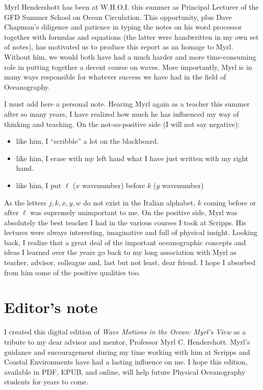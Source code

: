 Myrl Hendershott has been at W.H.O.I. this summer as Principal Lecturer of
the GFD Summer School on Ocean Circulation. This opportunity, plus Dave
Chapman's diligence and patience in typing the notes on his word processor together
with formulas and equations (the latter were handwritten in my own set of notes), has
motivated us to produce this report as an homage to Myrl. Without him, we would
both have had a much harder and more time-consuming role in putting together a
decent course on waves. More importantly, Myrl is in many ways responsible for
whatever success we have had in the field of Oceanography.

I must add here a personal note. Hearing Myrl again as a teacher this summer
after so many years, I have realized how much he has influenced my way of thinking
and teaching. On the not-so-positive side (I will not say negative):
\begin{itemize}[leftmargin=2.2em,itemsep=0pt,topsep=0.1em,parsep=0pt,partopsep=0pt]
	\item like him, I ``scribble'' a lot on the blackboard.
	\item like him, I erase with my left hand what I have just written with my right hand.
	\item like him, I put $\ell$ ($x$ wavenumber) before $k$ ($y$ wavenumber)
\end{itemize}
As the letters $j,k,x,y,w$ do not exist in the Italian alphabet, $k$ coming before or after
$\ell$ was supremely unimportant to me. On the positive side, Myrl was absolutely the
best teacher I had in the various courses I took at Scripps. His lectures were always
interesting, imaginative and full of physical insight. Looking back, I realize that a
great deal of the important oceanographic concepts and ideas I learned over the years
go back to my long association with Myrl as teacher, advisor, colleague and, last but
not least, dear friend. I hope I absorbed from him some of the positive qualities too.


\clearpage

\chapter*{Editor's note}

I created this digital edition of \textit{Wave Motions in the Ocean: Myrl's View} as a
tribute to my dear advisor and mentor, Professor Myrl C. Hendershott. Myrl's guidance and
encouragement during my time working with him at Scripps and Coastal Environments
have had a lasting influence on me. I hope this edition, available in PDF, EPUB, and
online, will help future Physical Oceanography students for years to come.

